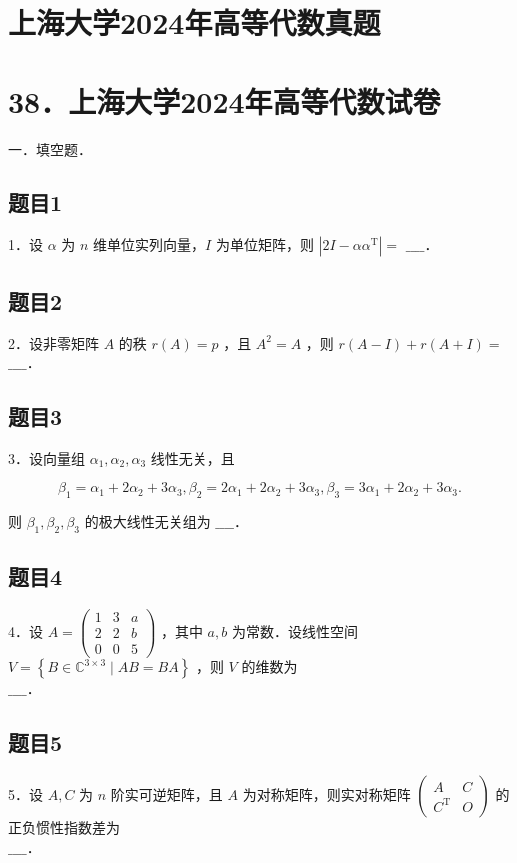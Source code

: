 \documentclass{article}
\begin{document}
\section*{上海大学2024年高等代数真题}
\section*{38．上海大学2024年高等代数试卷}
一．填空题．\\

\subsection{题目1}
1．设 \(\alpha\) 为 \(n\) 维单位实列向量，\(I\) 为单位矩阵，则 \(\left|2 I-\alpha \alpha^{\mathrm{T}}\right|=\) \(\_\_\_\_\)．

\subsection{题目2}
2．设非零矩阵 \(A\) 的秩 \(r(A)=p\) ，且 \(A^{2}=A\) ，则 \(r(A-I)+r(A+I)=\) \(\_\_\_\_\)．

\subsection{题目3}
3．设向量组 \(\alpha_{1}, \alpha_{2}, \alpha_{3}\) 线性无关，且

\[
\beta_{1}=\alpha_{1}+2 \alpha_{2}+3 \alpha_{3}, \beta_{2}=2 \alpha_{1}+2 \alpha_{2}+3 \alpha_{3}, \beta_{3}=3 \alpha_{1}+2 \alpha_{2}+3 \alpha_{3} .
\]

则 \(\beta_{1}, \beta_{2}, \beta_{3}\) 的极大线性无关组为 \(\_\_\_\_\)．

\subsection{题目4}
4．设 \(A=\left(\begin{array}{lll}1 & 3 & a \\ 2 & 2 & b \\ 0 & 0 & 5\end{array}\right)\) ，其中 \(a, b\) 为常数．设线性空间 \(V=\left\{B \in \mathbb{C}^{3 \times 3} \mid A B=B A\right\}\) ，则 \(V\) 的维数为\\
\(\_\_\_\_\)．

\subsection{题目5}
5．设 \(A, C\) 为 \(n\) 阶实可逆矩阵，且 \(A\) 为对称矩阵，则实对称矩阵 \(\left(\begin{array}{cc}A & C \\ C^{\mathrm{T}} & O\end{array}\right)\) 的正负惯性指数差为\\
\(\_\_\_\_\)．
\end{document}
